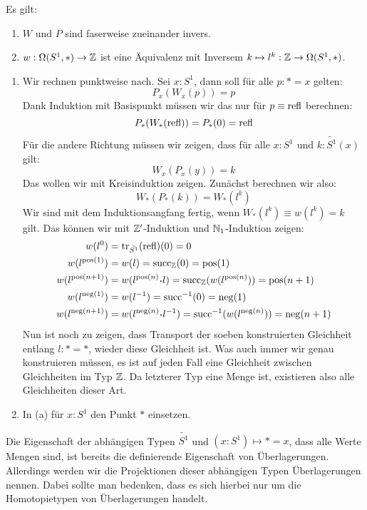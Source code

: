 \begin{theorem}
  Es gilt:
  \begin{enumerate}
  \item $W$ und $P$ sind faserweise zueinander invers.
  \item $w:\Omega(S^1,\ast)\to \mathbb{Z}$ ist eine Äquivalenz mit Inversem $k\mapsto l^{k}:\mathbb{Z}\to\Omega(S^1,\ast)$.
  \end{enumerate}
\end{theorem}
\begin{beweis}
  \begin{enumerate}
  \item   Wir rechnen punktweise nach. Sei $x:S^1$, dann soll für alle $p:\ast=x$ gelten:
  \[
    P_x(W_x(p))=p
  \]
  Dank Induktion mit Basispunkt müssen wir das nur für $p\equiv \mathrm{refl}$ berechnen:
  \[
    P_\ast(W_\ast(\mathrm{refl}))=P_\ast(0)=\mathrm{refl}
  \]
  Für die andere Richtung müssen wir zeigen, dass für alle $x:S^1$ und $k:\tilde{S^1}(x)$ gilt:
  \[
    W_x(P_x(y))=k
  \]
  Das wollen wir mit Kreisinduktion zeigen. Zunächst berechnen wir also:
  \[
    W_\ast(P_\ast(k))=W_\ast(l^{k})
  \]
  Wir sind mit dem Induktionsangfang fertig, wenn $W_\ast(l^k)\equiv w(l^k)=k$ gilt. Das können wir mit $\mathbb{Z}'$-Induktion und $\mathbb{N}_1$-Induktion zeigen:
  \begin{align*}
    w(l^0)&=\transp_{\tilde{S^1}}(\refl)(0)=0 \\
    w(l^{\mathrm{pos}(1)})&=w(l)=\mathrm{succ}_\Z(0)=\mathrm{pos}(1)  \\
    w(l^{\mathrm{pos}(n+1)})&=w(l^{\mathrm{pos}(n)}\kon l)= \mathrm{succ}_\Z(w(l^{\mathrm{pos}(n)}))=\mathrm{pos}(n+1) \\
    w(l^{\mathrm{neg}(1)})&=w(l^{-1})=\mathrm{succ}^{-1}(0)=\mathrm{neg}(1) \\
    w(l^{\mathrm{neg}(n+1)})&=w(l^{\mathrm{neg}(n)}\kon l^{-1})=\mathrm{succ}^{-1}(w(l^{\mathrm{neg}(n)}))=\mathrm{neg}(n+1)
  \end{align*}
  Nun ist noch zu zeigen, dass Transport der soeben konstruierten Gleichheit entlang $l:\ast=\ast$, wieder diese Gleichheit ist.
  Was auch immer wir genau konstruieren müssen, es ist auf jeden Fall eine Gleichheit zwischen Gleichheiten im Typ $\mathbb{Z}$.
  Da letzterer Typ eine Menge ist, existieren also alle Gleichheiten dieser Art.
\item In (a) für $x:S^1$ den Punkt $\ast$ einsetzen.
  \end{enumerate}
\end{beweis}

Die Eigenschaft der abhängigen Typen $\tilde{S^1}$ und $(x:S^1)\mapsto \ast=x$, dass alle Werte Mengen sind, ist bereits die definierende Eigenschaft von Überlagerungen.
Allerdings werden wir die Projektionen dieser abhängigen Typen Überlagerungen nennen.
Dabei sollte man bedenken, dass es sich hierbei nur um die Homotopietypen von Überlagerungen handelt.

